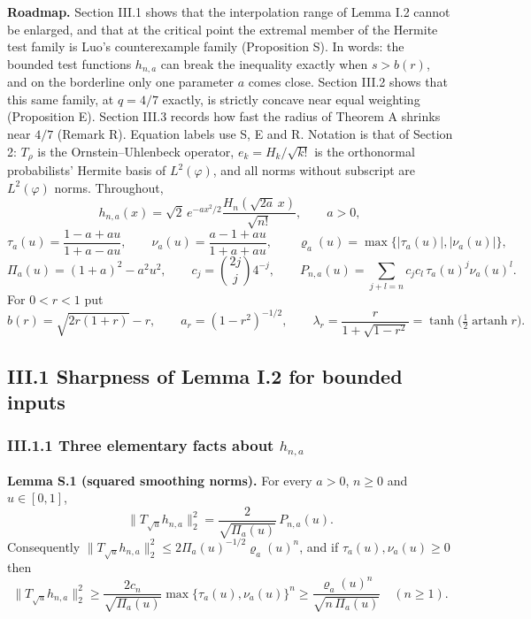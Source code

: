 \documentclass[
  british,
  10pt,
]{article}
\begin{document}
\textbf{Roadmap.} Section III.1 shows that the interpolation range of
Lemma I.2 cannot be enlarged, and that at the critical point the
extremal member of the Hermite test family is Luo's counterexample
family (Proposition S). In words: the bounded test functions \(h_{n,a}\)
can break the inequality exactly when \(s>b(r)\), and on the borderline
only one parameter \(a\) comes close. Section III.2 shows that this same
family, at \(q=4/7\) exactly, is strictly concave near equal weighting
(Proposition E). Section III.3 records how fast the radius of Theorem A
shrinks near \(4/7\) (Remark R). Equation labels use S, E and R.
Notation is that of Section 2: \(T_\rho\) is the Ornstein--Uhlenbeck
operator, \(e_k=H_k/\sqrt{k!}\) is the orthonormal probabilists' Hermite
basis of \(L^2(\varphi)\), and all norms without subscript are
\(L^2(\varphi)\) norms. Throughout, \[
h_{n,a}(x)=\sqrt2\,e^{-ax^2/2}\frac{H_n(\sqrt{2a}\,x)}{\sqrt{n!}},\qquad a>0,
\] \[
\tau_a(u)=\frac{1-a+au}{1+a-au},\qquad
\nu_a(u)=\frac{a-1+au}{1+a+au},\qquad
\varrho_a(u)=\max\{|\tau_a(u)|,|\nu_a(u)|\},
\] \[
\Pi_a(u)=(1+a)^2-a^2u^2,\qquad
c_j=\binom{2j}{j}4^{-j},\qquad
P_{n,a}(u)=\sum_{j+l=n}c_jc_l\,\tau_a(u)^j\nu_a(u)^l .
\] For \(0<r<1\) put \[
b(r)=\sqrt{2r(1+r)}-r,\qquad
a_r=(1-r^2)^{-1/2},\qquad
\lambda_r=\frac{r}{1+\sqrt{1-r^2}}=\tanh\!\big(\tfrac12\operatorname{artanh} r\big).
\tag{S0}
\]

\subsection{III.1 Sharpness of Lemma I.2 for bounded
inputs}\label{iii.1-sharpness-of-lemma-i.2-for-bounded-inputs}

\subsubsection{\texorpdfstring{III.1.1 Three elementary facts about
\(h_{n,a}\)}{III.1.1 Three elementary facts about h\_\{n,a\}}}\label{iii.1.1-three-elementary-facts-about-h_na}

\textbf{Lemma S.1 (squared smoothing norms).} For every \(a>0\),
\(n\ge0\) and \(u\in[0,1]\), \[
\|T_{\sqrt u}h_{n,a}\|_2^2=\frac{2}{\sqrt{\Pi_a(u)}}\,P_{n,a}(u).
\tag{S1}
\] Consequently
\(\|T_{\sqrt u}h_{n,a}\|_2^2\le2\Pi_a(u)^{-1/2}\varrho_a(u)^n\), and if
\(\tau_a(u),\nu_a(u)\ge0\) then \[
\|T_{\sqrt u}h_{n,a}\|_2^2\ge\frac{2c_n}{\sqrt{\Pi_a(u)}}\max\{\tau_a(u),\nu_a(u)\}^n
\ge\frac{\varrho_a(u)^n}{\sqrt{n\,\Pi_a(u)}}\quad(n\ge1).
\tag{S2}
\]
\end{document}
